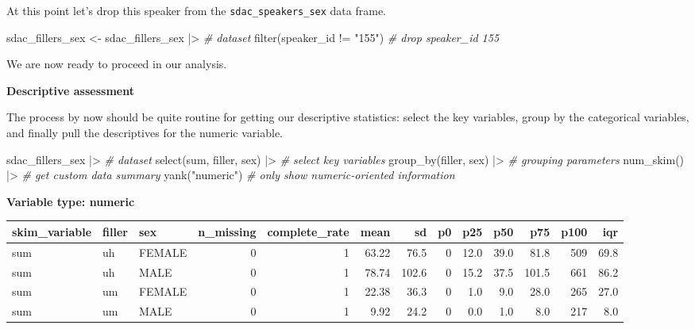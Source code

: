 \documentclass[
  letterpaper,
]{scrbook}
\newenvironment{Shaded}{\begin{snugshade}}{\end{snugshade}}
\newcommand{\CommentTok}[1]{\textcolor[rgb]{0.00,0.00,0.00}{\textit{#1}}}
\newcommand{\FunctionTok}[1]{\textcolor[rgb]{0.00,0.00,0.00}{#1}}
\newcommand{\NormalTok}[1]{\textcolor[rgb]{0.00,0.00,0.00}{#1}}
\newcommand{\OtherTok}[1]{\textcolor[rgb]{0.00,0.00,0.00}{#1}}
\newcommand{\SpecialCharTok}[1]{\textcolor[rgb]{0.00,0.00,0.00}{#1}}
\newcommand{\StringTok}[1]{\textcolor[rgb]{0.00,0.00,0.00}{#1}}
\begin{document}
At this point let's drop this speaker from the
\texttt{sdac\_speakers\_sex} data frame.

\begin{Shaded}
\begin{Highlighting}[]
\NormalTok{sdac\_fillers\_sex }\OtherTok{\textless{}{-}} 
\NormalTok{  sdac\_fillers\_sex }\SpecialCharTok{|\textgreater{}} \CommentTok{\# dataset}
  \FunctionTok{filter}\NormalTok{(speaker\_id }\SpecialCharTok{!=} \StringTok{"155"}\NormalTok{) }\CommentTok{\# drop speaker\_id 155}
\end{Highlighting}
\end{Shaded}

We are now ready to proceed in our analysis.

\textbf{Descriptive assessment}

The process by now should be quite routine for getting our descriptive
statistics: select the key variables, group by the categorical
variables, and finally pull the descriptives for the numeric variable.

\begin{Shaded}
\begin{Highlighting}[]
\NormalTok{sdac\_fillers\_sex }\SpecialCharTok{|\textgreater{}} \CommentTok{\# dataset}
  \FunctionTok{select}\NormalTok{(sum, filler, sex) }\SpecialCharTok{|\textgreater{}} \CommentTok{\# select key variables}
  \FunctionTok{group\_by}\NormalTok{(filler, sex) }\SpecialCharTok{|\textgreater{}} \CommentTok{\# grouping parameters}
  \FunctionTok{num\_skim}\NormalTok{() }\SpecialCharTok{|\textgreater{}} \CommentTok{\# get custom data summary}
  \FunctionTok{yank}\NormalTok{(}\StringTok{"numeric"}\NormalTok{) }\CommentTok{\# only show numeric{-}oriented information}
\end{Highlighting}
\end{Shaded}

\textbf{Variable type: numeric}

\begin{tabular}{l|l|l|r|r|r|r|r|r|r|r|r|r}
\hline
skim\_variable & filler & sex & n\_missing & complete\_rate & mean & sd & p0 & p25 & p50 & p75 & p100 & iqr\\
\hline
sum & uh & FEMALE & 0 & 1 & 63.22 & 76.5 & 0 & 12.0 & 39.0 & 81.8 & 509 & 69.8\\
\hline
sum & uh & MALE & 0 & 1 & 78.74 & 102.6 & 0 & 15.2 & 37.5 & 101.5 & 661 & 86.2\\
\hline
sum & um & FEMALE & 0 & 1 & 22.38 & 36.3 & 0 & 1.0 & 9.0 & 28.0 & 265 & 27.0\\
\hline
sum & um & MALE & 0 & 1 & 9.92 & 24.2 & 0 & 0.0 & 1.0 & 8.0 & 217 & 8.0\\
\hline
\end{tabular}
\end{document}
